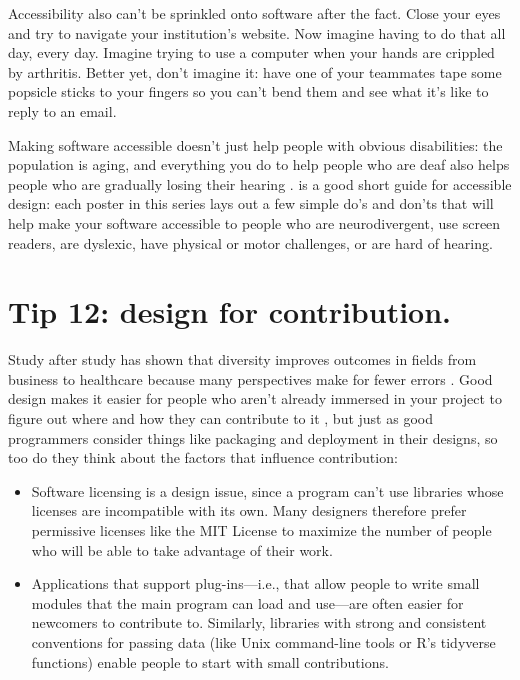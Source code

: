 \documentclass[10pt,letterpaper]{article}
\begin{document}
Accessibility also can't be sprinkled onto software after the fact.
Close your eyes and try to navigate your institution's website.
Now imagine having to do that all day, every day.
Imagine trying to use a computer when your hands are crippled by arthritis.
Better yet, don't imagine it:
have one of your teammates tape some popsicle sticks to your fingers so you can't bend them
and see what it's like to reply to an email.

Making software accessible doesn't just help people with obvious disabilities:
the population is aging,
and everything you do to help people who are deaf also helps people
who are gradually losing their hearing \cite{Johnson2017}.
\cite{UKHO} is a good short guide for accessible design:
each poster in this series lays out a few simple do's and don'ts that will help make your software accessible
to people who are neurodivergent,
use screen readers,
are dyslexic,
have physical or motor challenges,
or are hard of hearing.

\section*{Tip 12: design for contribution.}

Study after study has shown that diversity improves outcomes in fields from business to healthcare
because many perspectives make for fewer errors \cite{Gompers2018,Gomez2019}.
Good design makes it easier for people who aren't already immersed in your project
to figure out where and how they can contribute to it \cite{Sholler2019},
but just as good programmers consider things like packaging and deployment in their designs,
so too do they think about the factors that influence contribution:

\begin{itemize}

\item
  Software licensing is a design issue,
  since a program can't use libraries whose licenses are incompatible with its own.
  Many designers therefore prefer permissive licenses like the MIT License
  to maximize the number of people who will be able to take advantage of their work.

\item
  Applications that support plug-ins---i.e.,
  that allow people to write small modules that the main program can load and use---are
  often easier for newcomers to contribute to.
  Similarly,
  libraries with strong and consistent conventions for passing data
  (like Unix command-line tools or R's tidyverse functions)
  enable people to start with small contributions.

\end{itemize}
\end{document}

